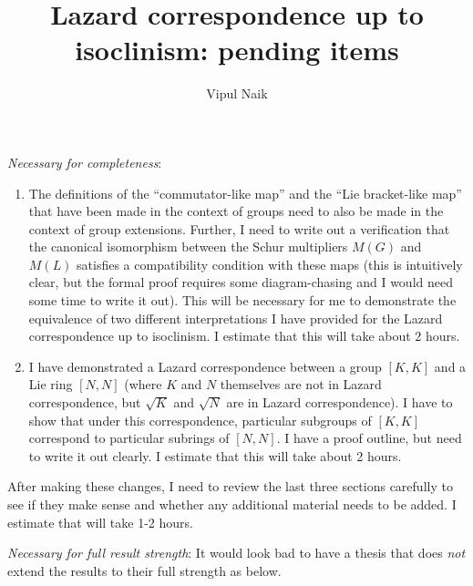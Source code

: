 \documentclass[10pt]{amsart}
\title{Lazard correspondence up to isoclinism: pending items}
\author{Vipul Naik}
\begin{document}
\maketitle
\onehalfspacing

{\em Necessary for completeness}:

\begin{enumerate}

\item The definitions of the ``commutator-like map'' and the ``Lie
  bracket-like map'' that have been made in the context of groups need
  to also be made in the context of group extensions. Further, I need
  to write out a verification that the canonical isomorphism between
  the Schur multipliers $M(G)$ and $M(L)$ satisfies a compatibility
  condition with these maps (this is intuitively clear, but the formal
  proof requires some diagram-chasing and I would need some time to
  write it out). This will be necessary for me to demonstrate the
  equivalence of two different interpretations I have provided for the
  Lazard correspondence up to isoclinism. I estimate that this will
  take about 2 hours.

\item I have demonstrated a Lazard correspondence between a group
  $[K,K]$ and a Lie ring $[N,N]$ (where $K$ and $N$ themselves are not
  in Lazard correspondence, but $\sqrt{K}$ and $\sqrt{N}$ are in
  Lazard correspondence). I have to show that under this
  correspondence, particular subgroups of $[K,K]$ correspond to
  particular subrings of $[N,N]$. I have a proof outline, but need to
  write it out clearly. I estimate that this will take about 2 hours.
\end{enumerate}

After making these changes, I need to review the last three sections
carefully to see if they make sense and whether any additional
material needs to be added. I estimate that will take 1-2 hours.

{\em Necessary for full result strength}: It would look bad to have a
thesis that does {\em not} extend the results to their full strength
as below.
\end{document}
